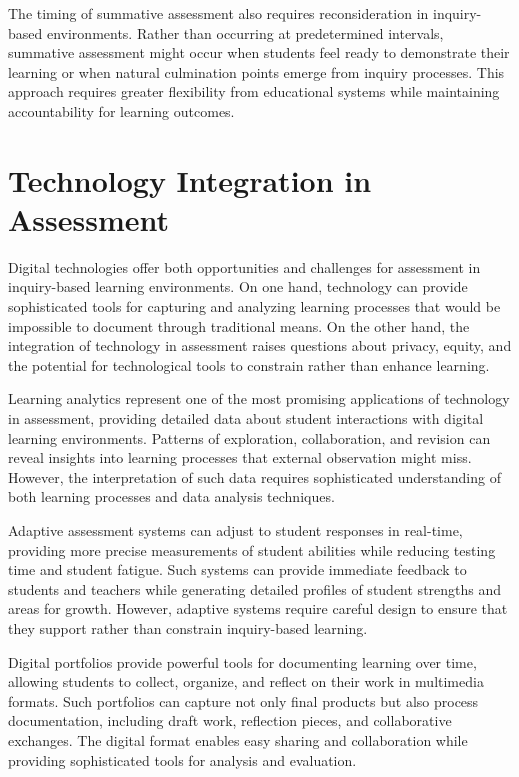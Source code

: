 \documentclass[
  Letterpaper,
]{scrbook}
\begin{document}
The timing of summative assessment also requires reconsideration in
inquiry-based environments. Rather than occurring at predetermined
intervals, summative assessment might occur when students feel ready to
demonstrate their learning or when natural culmination points emerge
from inquiry processes. This approach requires greater flexibility from
educational systems while maintaining accountability for learning
outcomes.

\section{Technology Integration in
Assessment}\label{technology-integration-in-assessment}

Digital technologies offer both opportunities and challenges for
assessment in inquiry-based learning environments. On one hand,
technology can provide sophisticated tools for capturing and analyzing
learning processes that would be impossible to document through
traditional means. On the other hand, the integration of technology in
assessment raises questions about privacy, equity, and the potential for
technological tools to constrain rather than enhance learning.

Learning analytics represent one of the most promising applications of
technology in assessment, providing detailed data about student
interactions with digital learning environments. Patterns of
exploration, collaboration, and revision can reveal insights into
learning processes that external observation might miss. However, the
interpretation of such data requires sophisticated understanding of both
learning processes and data analysis techniques.

Adaptive assessment systems can adjust to student responses in
real-time, providing more precise measurements of student abilities
while reducing testing time and student fatigue. Such systems can
provide immediate feedback to students and teachers while generating
detailed profiles of student strengths and areas for growth. However,
adaptive systems require careful design to ensure that they support
rather than constrain inquiry-based learning.

Digital portfolios provide powerful tools for documenting learning over
time, allowing students to collect, organize, and reflect on their work
in multimedia formats. Such portfolios can capture not only final
products but also process documentation, including draft work,
reflection pieces, and collaborative exchanges. The digital format
enables easy sharing and collaboration while providing sophisticated
tools for analysis and evaluation.
\end{document}
